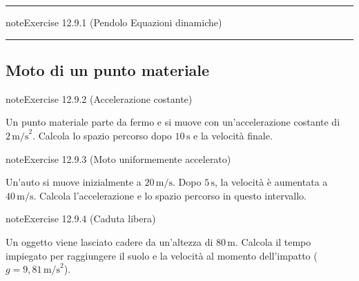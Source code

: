 \documentclass[letterpaper,10pt,italian]{jupyterBook}
\begin{document}
\bigskip\hrule\bigskip

 \label{exercise:pendulum-eom}

\begin{sphinxadmonition}{note}{Exercise 12.9.1 (Pendolo \sphinxhyphen{} Equazioni dinamiche)}


\end{sphinxadmonition}


\bigskip\hrule\bigskip



\subsection{Moto di un punto materiale}
\label{\detokenize{ch/mechanics/dynamics-problems:moto-di-un-punto-materiale}} \label{exercise:ch/mechanics/dynamics-problems-exercise-1}

\begin{sphinxadmonition}{note}{Exercise 12.9.2 (Accelerazione costante)}



\sphinxAtStartPar
Un punto materiale parte da fermo e si muove con un’accelerazione costante di \(2 \, \text{m/s}^2\). Calcola lo spazio percorso dopo \(10 \, \text{s}\) e la velocità finale.
\end{sphinxadmonition}
 \label{exercise:ch/mechanics/dynamics-problems-exercise-2}

\begin{sphinxadmonition}{note}{Exercise 12.9.3 (Moto uniformemente accelerato)}



\sphinxAtStartPar
Un’auto si muove inizialmente a \(20 \, \text{m/s}\). Dopo \(5 \, \text{s}\), la velocità è aumentata a \(40 \, \text{m/s}\). Calcola l’accelerazione e lo spazio percorso in questo intervallo.
\end{sphinxadmonition}
 \label{exercise:ch/mechanics/dynamics-problems-exercise-3}

\begin{sphinxadmonition}{note}{Exercise 12.9.4 (Caduta libera)}



\sphinxAtStartPar
Un oggetto viene lasciato cadere da un’altezza di \(80 \, \text{m}\). Calcola il tempo impiegato per raggiungere il suolo e la velocità al momento dell’impatto (\(g = 9,81 \, \text{m/s}^2\)).
\end{sphinxadmonition}
 \label{exercise:ch/mechanics/dynamics-problems-exercise-4}
\end{document}
